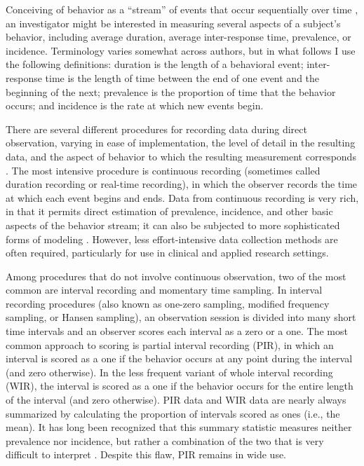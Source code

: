 \documentclass[11pt]{article}
\begin{document}
Conceiving of behavior as a ``stream'' of events that occur sequentially over time \citep{Rogosa1991statistical}, an investigator might be interested in measuring several aspects of a subject's behavior, including average duration, average inter-response time, prevalence, or incidence. Terminology varies somewhat across authors, but in what follows I use the following definitions: duration is the length of a behavioral event; inter-response time is the length of time between the end of one event and the beginning of the next; prevalence is the proportion of time that the behavior occurs; and incidence is the rate at which new events begin. 

There are several different procedures for recording data during direct observation, varying in ease of implementation, the level of detail in the resulting data, and the aspect of behavior to which the resulting measurement corresponds \citep[for surveys of major recording procedures, see][]{Altmann1974observational, Hartmann1990observational, Primavera1996measurement}. The most intensive procedure is continuous recording (sometimes called duration recording or real-time recording), in which the observer records the time at which each event begins and ends. Data from continuous recording is very rich, in that it permits direct estimation of prevalence, incidence, and other basic aspects of the behavior stream; it can also be subjected to more sophisticated forms of modeling \citep[e.g.,][]{Bakeman2011, Haccou1992}. However, less effort-intensive data collection methods are often required, particularly for use in clinical and applied research settings. 

Among procedures that do not involve continuous observation, two of the most common are interval recording and momentary time sampling. In interval recording procedures (also known as one-zero sampling, modified frequency sampling, or Hansen sampling), an observation session is divided into many short time intervals and an observer scores each interval as a zero or a one. The most common approach to scoring is partial interval recording (PIR),  in which an interval is scored as a one if the behavior occurs at any point during the interval (and zero otherwise). In the less frequent variant of whole interval recording (WIR), the interval is scored as a one if the behavior occurs for the entire length of the interval (and zero otherwise). PIR data and WIR data are nearly always summarized by calculating the proportion of intervals scored as ones (i.e., the mean). It has long been recognized that this summary statistic measures neither prevalence nor incidence, but rather a combination of the two that is very difficult to interpret \citep{Altmann1974observational, Kraemer1979one, Rogosa1991statistical}. Despite this flaw, PIR remains in wide use. 
\end{document}
